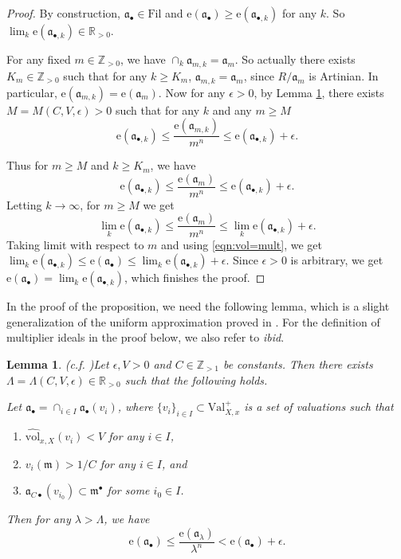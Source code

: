 \documentclass[11pt, leqno]{amsart}%
\theoremstyle{plain}
\newtheorem{lemma}[theorem]{Lemma}
\theoremstyle{definition}
\theoremstyle{remark}
\newcommand{\bR}{\mathbb{R}}
\newcommand{\bZ}{\mathbb{Z}}
\newcommand{\fa}{\mathfrak{a}}
\newcommand{\fm}{\mathfrak{m}}
\newcommand{\Val}{\mathrm{Val}}
\newcommand{\nvol}{\widehat{\mathrm{vol}}}
\newcommand{\e}{\mathrm{e}}
\newcommand{\Fil}{\mathrm{Fil}}
\numberwithin{equation}{section}
\begin{document}
\begin{proof}
    By construction, $\fa_\bullet\in\Fil$ and $\e(\fa_\bullet)\ge \e(\fa_{\bullet,k})$ for any $k$. So $\lim_k \e(\fa_{\bullet,k})\in\bR_{>0}$. 
	
    For any fixed $m\in\bZ_{>0}$, we have $\cap_k \fa_{m,k}=\fa_m$. So actually there exists $K_m\in\bZ_{>0}$ such that for any $k\ge K_m$, $\fa_{m,k}=\fa_m$, since $R/\fa_m$ is Artinian. In particular, $\e(\fa_{m,k})=\e(\fa_m)$. Now for any $\epsilon>0$, by Lemma \ref{lem:uniform approximation}, there exists $M=M(C,V,\epsilon)>0$ such that for any $k$ and any $m\ge M$
    \[
        \e(\fa_{\bullet,k})\le \frac{\e(\fa_{m,k})}{m^n}\le \e(\fa_{\bullet,k})+\epsilon.
    \]
	
    Thus for $m\ge M$ and $k\ge K_m$, we have 
    \[
        \e(\fa_{\bullet,k})\le \frac{\e(\fa_m)}{m^n}\le \e(\fa_{\bullet,k})+\epsilon.
    \]
    Letting $k\to\infty$, for $m\ge M$ we get
    \[
        \lim_k \e(\fa_{\bullet,k})\le \frac{\e(\fa_m)}{m^n} \le \lim_k \e(\fa_{\bullet,k})+\epsilon.
    \]
    Taking limit with respect to $m$ and using \eqref{eqn:vol=mult}, we get $\lim_k\e(\fa_{\bullet,k})\le \e(\fa_\bullet)\le \lim_k\e(\fa_{\bullet,k})+\epsilon$. Since $\epsilon>0$ is arbitrary, we get $\e(\fa_\bullet)=\lim_k \e(\fa_{\bullet,k})$, which finishes the proof.
\end{proof}

In the proof of the proposition, we need the following lemma, which is a slight generalization of the uniform approximation proved in \cite{Blu18}. For the definition of multiplier ideals in the proof below, we also refer to \emph{ibid}.

\begin{lemma}(c.f. \cite[Proposition 3.7]{Blu18})\label{lem:uniform approximation}
    Let $\epsilon,V>0$ and $C\in\bZ_{>1}$ be constants. Then there exists $\Lambda=\Lambda(C,V,\epsilon)\in\bR_{>0}$ such that the following holds.
	
    Let $\fa_\bullet=\cap_{i\in I}\fa_\bullet(v_i)$, where $\{v_i\}_{i\in I}\subset\Val^+_{X,x}$ is a set of valuations such that 
    \begin{enumerate}
        \item $\nvol_{x,X}(v_i)<V$ for any $i\in I$,
		
        \item $v_i(\fm)>1/C$ for any $i\in I$, and
		
        \item $\fa_{C\bullet}(v_{i_0})\subset \fm^\bullet$ for some $i_0\in I$.
    \end{enumerate}
    Then for any $\lambda>\Lambda$, we have
    \[
        \e(\fa_\bullet)\le\frac{\e(\fa_\lambda)}{\lambda^n}< \e(\fa_\bullet)+\epsilon.
    \]
\end{lemma}
\end{document}

